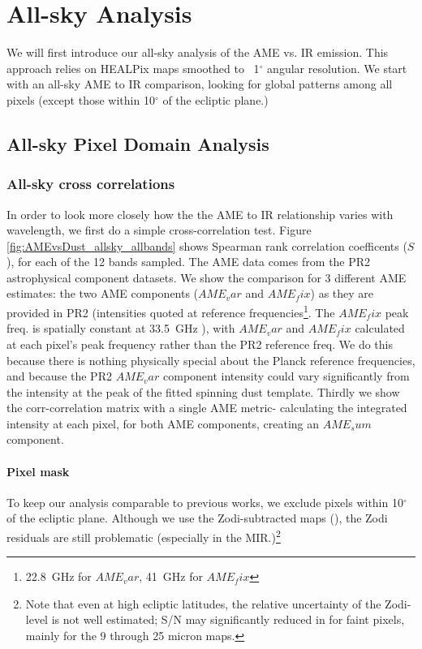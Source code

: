 \chapter{All-sky Analysis}
\label{sec:analysis}

    We will first introduce our all-sky analysis of the AME vs. IR emission. This approach relies on HEALPix maps smoothed to  ~1$^{\circ}$ angular resolution. We start with an all-sky AME to IR comparison, looking for global patterns among all pixels (except those within 10$^{\circ}$ of the ecliptic plane.)

\section{All-sky Pixel Domain Analysis}
  \subsection{All-sky cross correlations}
	In order to look more closely how the the AME to IR relationship varies with wavelength, we first do a simple cross-correlation test. Figure \ref{fig:AMEvsDust_allsky_allbands} shows Spearman rank correlation coefficents ($S$), for each of the 12 bands sampled. The AME data comes from the PR2 astrophysical component datasets. We show the comparison for 3 different AME estimates: the two AME components ($AME_var$ and $AME_fix$) as they are provided in PR2 (intensities quoted at reference frequencies\footnote{22.8~GHz for $AME_var$, 41~GHz for $AME_fix$}. The  $AME_fix$ peak freq. is spatially constant at 33.5~GHz ), with $AME_var$ and $AME_fix$ calculated at each pixel's peak frequency rather than the PR2 reference freq. We do this because there is nothing physically special about the Planck reference frequencies, and because the PR2 $AME_var$ component intensity could vary significantly from the intensity at the peak of the fitted spinning dust template. Thirdly we show the corr-correlation matrix with a single AME metric- calculating the integrated intensity at each pixel, for both AME components, creating an $AME_sum$ component.
    \subsubsection{Pixel mask}
    To keep our analysis comparable to previous works, we exclude pixels within 10$^{\circ}$ of the ecliptic plane. Although we use the Zodi-subtracted maps (\citep{kelsall82, kondo15}), the Zodi residuals are still problematic (especially in the MIR.)\footnote{Note that even at high ecliptic latitudes, the relative uncertainty of the Zodi-level is not well estimated; S/N may significantly reduced in for faint pixels, mainly for the 9 through 25 micron maps.}

